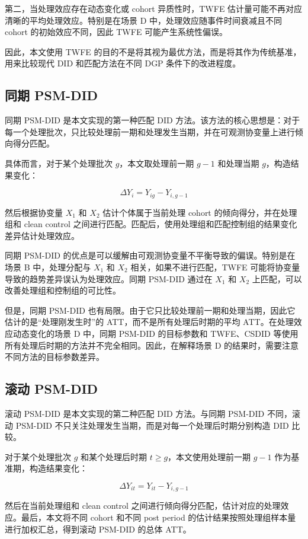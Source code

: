 \documentclass[
  fontset=windows]{ctexart}
\begin{document}
第二，当处理效应存在动态变化或 cohort 异质性时，TWFE
估计量可能不再对应清晰的平均处理效应。特别是在场景 D
中，处理效应随事件时间衰减且不同 cohort 的初始效应不同，因此 TWFE
可能产生系统性偏误。

因此，本文使用 TWFE
的目的不是将其视为最优方法，而是将其作为传统基准，用来比较现代 DID
和匹配方法在不同 DGP 条件下的改进程度。

\subsection{同期 PSM-DID}\label{ux540cux671f-psm-did}

同期 PSM-DID 是本文实现的第一种匹配 DID
方法。该方法的核心思想是：对于每一个处理批次，只比较处理前一期和处理发生当期，并在可观测协变量上进行倾向得分匹配。

具体而言，对于某个处理批次 \(g\)，本文取处理前一期 \(g-1\) 和处理当期
\(g\)，构造结果变化：

\[
\Delta Y_i=Y_{ig}-Y_{i,g-1}
\]

然后根据协变量 \(X_1\) 和 \(X_2\) 估计个体属于当前处理 cohort
的倾向得分，并在处理组和 clean control
之间进行匹配。匹配后，使用处理组和匹配控制组的结果变化差异估计处理效应。

同期 PSM-DID
的优点是可以缓解由可观测协变量不平衡导致的偏误。特别是在场景 B
中，处理分配与 \(X_1\) 和 \(X_2\) 相关，如果不进行匹配，TWFE
可能将协变量导致的趋势差异误认为处理效应。同期 PSM-DID 通过在 \(X_1\) 和
\(X_2\) 上匹配，可以改善处理组和控制组的可比性。

但是，同期 PSM-DID
也有局限。由于它只比较处理前一期和处理当期，因此它估计的是``处理刚发生时''的
ATT，而不是所有处理后时期的平均 ATT。在处理效应动态变化的场景 D 中，同期
PSM-DID 的目标参数和 TWFE、CSDID
等使用所有处理后时期的方法并不完全相同。因此，在解释场景 D
的结果时，需要注意不同方法的目标参数差异。

\subsection{滚动 PSM-DID}\label{ux6edaux52a8-psm-did}

滚动 PSM-DID 是本文实现的第二种匹配 DID 方法。与同期 PSM-DID 不同，滚动
PSM-DID 不只关注处理发生当期，而是对每一个处理后时期分别构造 DID 比较。

对于某个处理批次 \(g\) 和某个处理后时期 \(t\geq g\)，本文使用处理前一期
\(g-1\) 作为基准期，构造结果变化：

\[
\Delta Y_{it}=Y_{it}-Y_{i,g-1}
\]

然后在当前处理组和 clean control
之间进行倾向得分匹配，估计对应的处理效应。最后，本文将不同 cohort 和不同
post period 的估计结果按照处理组样本量进行加权汇总，得到滚动 PSM-DID
的总体 ATT。
\end{document}

